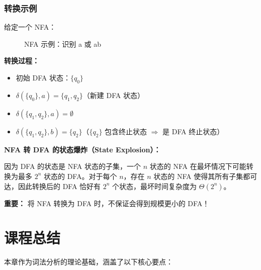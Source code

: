 \documentclass[12pt,a4paper]{ctexart}
\begin{document}
\subsubsection{转换示例}

给定一个 NFA：

\begin{figure}[ht]
\centering
{}
\caption{NFA 示例：识别 a 或 ab}
\end{figure}

\textbf{转换过程：}
\begin{itemize}[itemsep=0.2em]
  \item 初始 DFA 状态：$\{q_0\}$
  \item $\delta(\{q_0\}, a) = \{q_1, q_2\}$（新建 DFA 状态）
  \item $\delta(\{q_1, q_2\}, a) = \emptyset$
  \item $\delta(\{q_1, q_2\}, b) = \{q_2\}$（$\{q_2\}$ 包含终止状态 $\Rightarrow$ 是 DFA 终止状态）
\end{itemize}

\begin{warnbox}
  \textbf{NFA 转 DFA 的状态爆炸（State Explosion）：}

  因为 DFA 的状态是 NFA 状态的子集，一个 $n$ 状态的 NFA 在最坏情况下可能转换为最多 $2^n$ 状态的 DFA。对于每个 $n$，存在 $n$ 状态的 NFA 使得其所有子集都可达，因此转换后的 DFA 恰好有 $2^n$ 个状态，最坏时间复杂度为 $\Theta(2^n)$。

  \textbf{重要：} 将 NFA 转换为 DFA 时，不保证会得到规模更小的 DFA！
\end{warnbox}

\newpage

\section{课程总结}

本章作为词法分析的理论基础，涵盖了以下核心要点：
\end{document}
